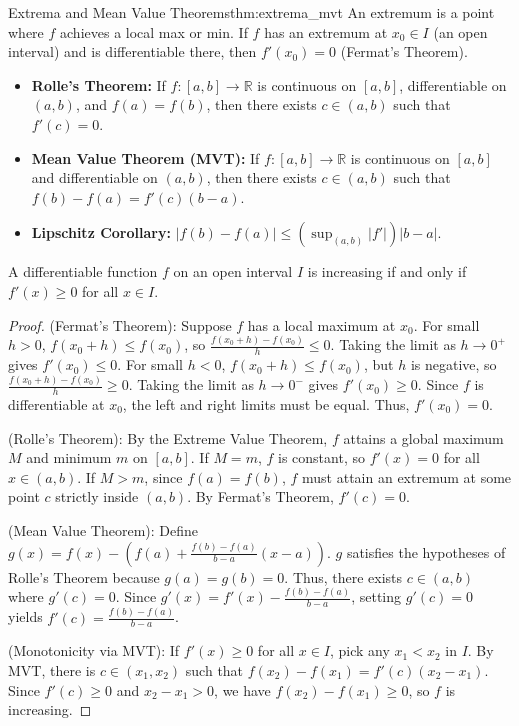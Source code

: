 \documentclass[11pt, a4paper]{article}
\begin{document}
\begin{theorem}{Extrema and Mean Value Theorems}{thm:extrema_mvt}
An extremum is a point where $f$ achieves a local max or min. If $f$ has an extremum at $x_0 \in I$ (an open interval) and is differentiable there, then $f'(x_0) = 0$ (Fermat's Theorem).
\begin{itemize}
    \item \textbf{Rolle's Theorem:} If $f: [a,b] \to \mathbb{R}$ is continuous on $[a,b]$, differentiable on $(a,b)$, and $f(a) = f(b)$, then there exists $c \in (a,b)$ such that $f'(c) = 0$.
    \item \textbf{Mean Value Theorem (MVT):} If $f: [a,b] \to \mathbb{R}$ is continuous on $[a,b]$ and differentiable on $(a,b)$, then there exists $c \in (a,b)$ such that $f(b) - f(a) = f'(c)(b-a)$.
    \item \textbf{Lipschitz Corollary:} $|f(b) - f(a)| \le \left(\sup_{(a,b)} |f'|\right) |b - a|$.
\end{itemize}
A differentiable function $f$ on an open interval $I$ is increasing if and only if $f'(x) \ge 0$ for all $x \in I$.
\end{theorem}
\begin{proof}
(Fermat's Theorem): Suppose $f$ has a local maximum at $x_0$. For small $h > 0$, $f(x_0 + h) \le f(x_0)$, so $\frac{f(x_0 + h) - f(x_0)}{h} \le 0$. Taking the limit as $h \to 0^+$ gives $f'(x_0) \le 0$.
For small $h < 0$, $f(x_0 + h) \le f(x_0)$, but $h$ is negative, so $\frac{f(x_0 + h) - f(x_0)}{h} \ge 0$. Taking the limit as $h \to 0^-$ gives $f'(x_0) \ge 0$.
Since $f$ is differentiable at $x_0$, the left and right limits must be equal. Thus, $f'(x_0) = 0$.

(Rolle's Theorem): By the Extreme Value Theorem, $f$ attains a global maximum $M$ and minimum $m$ on $[a,b]$.
If $M = m$, $f$ is constant, so $f'(x) = 0$ for all $x \in (a,b)$.
If $M > m$, since $f(a) = f(b)$, $f$ must attain an extremum at some point $c$ strictly inside $(a,b)$. By Fermat's Theorem, $f'(c) = 0$.

(Mean Value Theorem): Define $g(x) = f(x) - \left( f(a) + \frac{f(b) - f(a)}{b - a}(x - a) \right)$. 
$g$ satisfies the hypotheses of Rolle's Theorem because $g(a) = g(b) = 0$. Thus, there exists $c \in (a,b)$ where $g'(c) = 0$.
Since $g'(x) = f'(x) - \frac{f(b) - f(a)}{b - a}$, setting $g'(c) = 0$ yields $f'(c) = \frac{f(b) - f(a)}{b - a}$.

(Monotonicity via MVT): If $f'(x) \ge 0$ for all $x \in I$, pick any $x_1 < x_2$ in $I$. By MVT, there is $c \in (x_1, x_2)$ such that $f(x_2) - f(x_1) = f'(c)(x_2 - x_1)$. Since $f'(c) \ge 0$ and $x_2 - x_1 > 0$, we have $f(x_2) - f(x_1) \ge 0$, so $f$ is increasing.
\end{proof}
\end{document}
